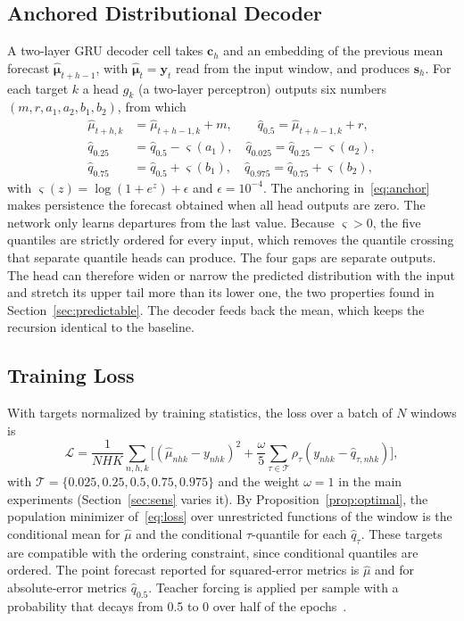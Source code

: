 \subsection{Anchored Distributional Decoder}
A two-layer GRU decoder cell takes $\mathbf{c}_h$ and an embedding of the previous mean forecast $\hat{\boldsymbol{\mu}}_{t+h-1}$, with $\hat{\boldsymbol{\mu}}_{t}=\mathbf{y}_t$ read from the input window, and produces $\mathbf{s}_h$. For each target $k$ a head $g_k$ (a two-layer perceptron) outputs six numbers $(m,r,a_1,a_2,b_1,b_2)$, from which
\begin{align}
\hat{\mu}_{t+h,k}&=\hat{\mu}_{t+h-1,k}+m, \qquad \hat{q}_{0.5}=\hat{\mu}_{t+h-1,k}+r,\label{eq:anchor}\\
\hat{q}_{0.25}&=\hat{q}_{0.5}-\varsigma(a_1),\quad \hat{q}_{0.025}=\hat{q}_{0.25}-\varsigma(a_2),\nonumber\\
\hat{q}_{0.75}&=\hat{q}_{0.5}+\varsigma(b_1),\quad \hat{q}_{0.975}=\hat{q}_{0.75}+\varsigma(b_2),\nonumber
\end{align}
with $\varsigma(z)=\log(1+e^{z})+\epsilon$ and $\epsilon=10^{-4}$. The anchoring in~\eqref{eq:anchor} makes persistence the forecast obtained when all head outputs are zero. The network only learns departures from the last value. Because $\varsigma>0$, the five quantiles are strictly ordered for every input, which removes the quantile crossing that separate quantile heads can produce. The four gaps are separate outputs. The head can therefore widen or narrow the predicted distribution with the input and stretch its upper tail more than its lower one, the two properties found in Section~\ref{sec:predictable}. The decoder feeds back the mean, which keeps the recursion identical to the baseline.

\subsection{Training Loss}
With targets normalized by training statistics, the loss over a batch of $N$ windows is
\begin{equation}
\mathcal{L}=\frac{1}{NHK}\sum_{n,h,k}\Big[(\hat{\mu}_{nhk}-y_{nhk})^2+\frac{\omega}{5}\sum_{\tau\in\mathcal{T}}\rho_\tau(y_{nhk}-\hat{q}_{\tau,nhk})\Big],
\label{eq:loss}
\end{equation}
with $\mathcal{T}=\{0.025,0.25,0.5,0.75,0.975\}$ and the weight $\omega=1$ in the main experiments (Section~\ref{sec:sens} varies it). By Proposition~\ref{prop:optimal}, the population minimizer of~\eqref{eq:loss} over unrestricted functions of the window is the conditional mean for $\hat{\mu}$ and the conditional $\tau$-quantile for each $\hat{q}_\tau$. These targets are compatible with the ordering constraint, since conditional quantiles are ordered. The point forecast reported for squared-error metrics is $\hat{\mu}$ and for absolute-error metrics $\hat{q}_{0.5}$. Teacher forcing is applied per sample with a probability that decays from 0.5 to 0 over half of the epochs~\cite{bengio2015scheduled}.

